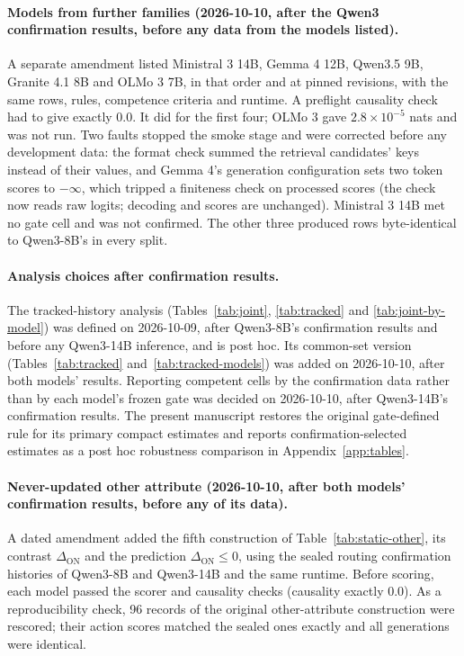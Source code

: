 \paragraph{Models from further families (2026-10-10, after the Qwen3 confirmation results, before any data
from the models listed).} A separate amendment listed Ministral 3 14B, Gemma 4 12B, Qwen3.5 9B, Granite 4.1
8B and OLMo 3 7B, in that order and at pinned revisions, with the same rows, rules, competence criteria and
runtime. A preflight causality check had to give exactly 0.0. It did for the first four; OLMo 3 gave
$2.8\times10^{-5}$ nats and was not run. Two faults stopped the smoke stage and were corrected before any
development data: the format check summed the retrieval candidates' keys instead of their values, and Gemma
4's generation configuration sets two token scores to $-\infty$, which tripped a finiteness check on processed
scores (the check now reads raw logits; decoding and scores are unchanged). Ministral 3 14B met no gate cell
and was not confirmed. The other three produced rows byte-identical to Qwen3-8B's in every split.

\paragraph{Analysis choices after confirmation results.} The tracked-history analysis
(Tables~\ref{tab:joint}, \ref{tab:tracked} and \ref{tab:joint-by-model}) was defined on 2026-10-09, after
Qwen3-8B's confirmation results and before any Qwen3-14B inference, and is post hoc. Its common-set version
(Tables~\ref{tab:tracked} and~\ref{tab:tracked-models}) was added on 2026-10-10, after both models' results. Reporting competent cells by
the confirmation data rather than by each model's frozen gate was decided on 2026-10-10, after Qwen3-14B's
confirmation results. The present manuscript restores the original gate-defined rule for its primary
compact estimates and reports confirmation-selected estimates as a post hoc robustness comparison in
Appendix~\ref{app:tables}.

\paragraph{Never-updated other attribute (2026-10-10, after both models' confirmation results, before any
of its data).} A dated amendment added the fifth construction of Table~\ref{tab:static-other}, its contrast
$\Delta_{\mathrm{ON}}$ and the prediction $\Delta_{\mathrm{ON}} \le 0$, using the sealed routing confirmation
histories of Qwen3-8B and Qwen3-14B and the same runtime. Before scoring, each model passed the scorer and
causality checks (causality exactly 0.0). As a reproducibility check, 96 records of the original
other-attribute construction were rescored; their action scores matched the sealed ones exactly and all
generations were identical.

